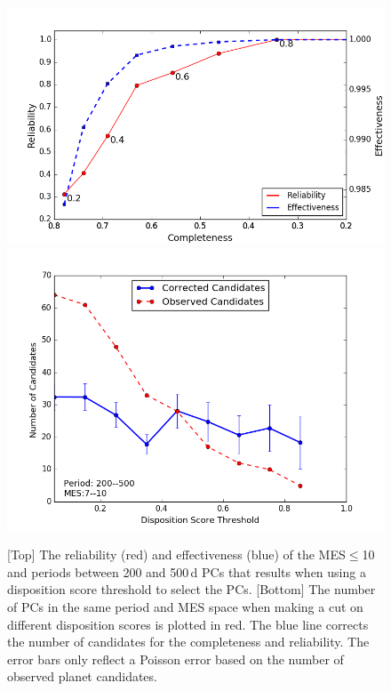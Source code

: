 \begin{figure}[h!]
 \begin{center}
  \includegraphics[width=1.0\linewidth]{fig-CRadjustScore-DR25.png}
  \includegraphics[width=1.0\linewidth]{fig-varyScoreNcandidatesBox2.png}
  \caption{\label{f:adjscore}[Top] The reliability (red) and effectiveness (blue) of the MES$\leq$10 and periods between 200 and 500\,d PCs that results when using a disposition score threshold to select the PCs.  [Bottom] The number of PCs in the same period and MES space when making a cut on different disposition scores is plotted in red.  The blue line corrects the number of candidates for the completeness and reliability. The error bars only reflect a Poisson error based on the number of observed planet candidates.}
 \end{center}
 \end{figure}


